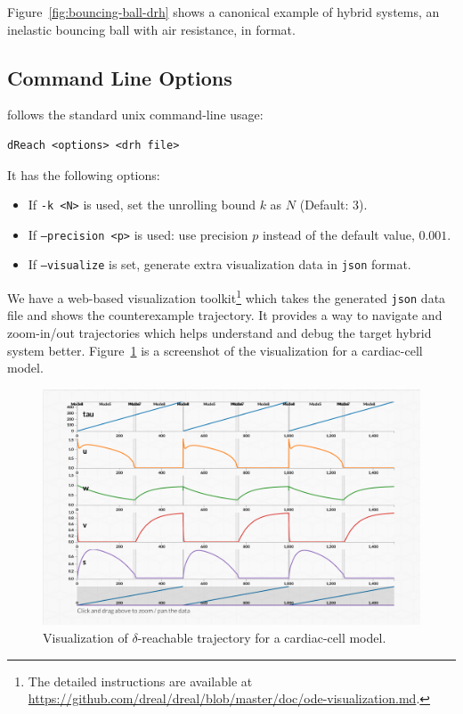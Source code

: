 Figure~\ref{fig:bouncing-ball-drh} shows a canonical example of hybrid
systems, an inelastic bouncing ball with air resistance, in \drh{}
format.

\subsection{Command Line Options}
\dReach{} follows the standard unix command-line usage:
\begin{Verbatim}[fontfamily=courier, framesep=1mm, fontsize=\small]
dReach <options> <drh file>
\end{Verbatim}
It has the following options:
\begin{itemize}
\item If \texttt{-k <N>} is used, set the unrolling bound $k$ as $N$
  (Default: 3).
\item If \texttt{--precision <p>} is used: use precision $p$ instead of
  the default value, $0.001$.
\item If \texttt{--visualize} is set, \dReach{} generate extra
  visualization data in \texttt{json} format.
\end{itemize}
We have a web-based visualization toolkit\footnote{The detailed
  instructions are available at
  \url{https://github.com/dreal/dreal/blob/master/doc/ode-visualization.md}.}
which takes the generated \texttt{json} data file and shows the
counterexample trajectory. It provides a way to navigate and
zoom-in/out trajectories which helps understand and debug the target
hybrid system better. Figure~\ref{fig:viz} is a screenshot of the
visualization for a cardiac-cell model.
\begin{figure}
  \centering
  \includegraphics[width=\textwidth]{images/cardiac}
  \caption{Visualization of $\delta$-reachable trajectory for
    a cardiac-cell model.}
  \label{fig:viz}
\end{figure}


